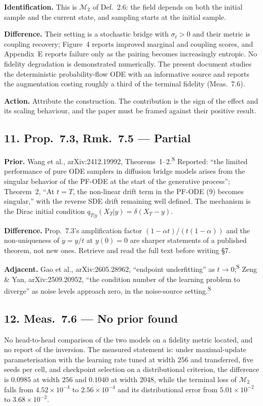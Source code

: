 \documentclass[11pt]{article}
\newcommand{\Sec}{\textsuperscript{S}}
\begin{document}
\textbf{Identification.} This is $\mathcal M_2$ of Def.~2.6: the field depends on both the initial
sample and the current state, and sampling starts at the initial sample.

\textbf{Difference.} Their setting is a stochastic bridge with $\sigma_t>0$ and their metric is
coupling recovery; Figure~4 reports improved marginal and coupling scores, and Appendix~E reports
failure only as the pairing becomes increasingly entropic. No fidelity degradation is demonstrated
numerically. The present document studies the deterministic probability-flow ODE with an
informative source and reports the augmentation costing roughly a third of the terminal fidelity
(Meas.~7.6).

\textbf{Action.} Attribute the construction. The contribution is the sign of the effect and its
scaling behaviour, and the paper must be framed against their positive result.

\subsection*{11. Prop.~7.3, Rmk.~7.5 --- Partial}

\textbf{Prior.} Wang et al., arXiv:2412.19992, Theorems~1--2.\Sec{} Reported: ``the limited
performance of pure ODE samplers in diffusion bridge models arises from the singular behavior of
the PF-ODE at the start of the generative process''; Theorem~2, ``At $t=T$, the non-linear drift
term in the PF-ODE (9) becomes singular,'' with the reverse SDE drift remaining well defined. The
mechanism is the Dirac initial condition $q_{T|y}(X_T|y)=\delta(X_T-y)$.

\textbf{Difference.} Prop.~7.3's amplification factor $(1-\alpha t)/(t(1-\alpha))$ and the
non-uniqueness of $\dot y=y/t$ at $y(0)=0$ are sharper statements of a published theorem, not new
ones. Retrieve and read the full text before writing \S7.

\textbf{Adjacent.} Gao et al., arXiv:2605.28962, ``endpoint underfitting'' as $t\to0$;\Sec{}
Zeng \& Yan, arXiv:2509.20952, ``the condition number of the learning problem to diverge'' as
noise levels approach zero, in the noise-source setting.\Sec

\subsection*{12. Meas.~7.6 --- No prior found}

No head-to-head comparison of the two models on a fidelity metric located, and no report of the
inversion. The measured statement is: under maximal-update parameterisation with the learning rate
tuned at width $256$ and transferred, five seeds per cell, and checkpoint selection on a
distributional criterion, the difference is $0.0985$ at width $256$ and $0.1040$ at width $2048$,
while the terminal loss of $\mathcal M_2$ falls from $4.52\times10^{-4}$ to $2.56\times10^{-4}$
and its distributional error from $5.01\times10^{-2}$ to $3.68\times10^{-2}$.
\end{document}
